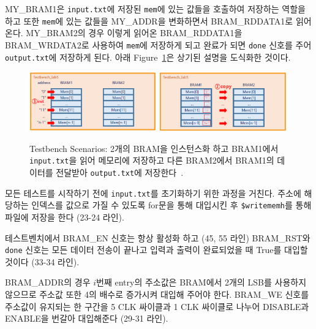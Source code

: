 \documentclass{article}
\begin{document}
MY\_BRAM1은 \texttt{input.txt}에 저장된 \texttt{mem}에 있는 값들을 호출하여 저장하는 역할을 하고 또한 \texttt{mem}에 있는 값들을 MY\_ADDR을 변화하면서 BRAM\_RDDATA1로 읽어온다. MY\_BRAM2의 경우 이렇게 읽어온 \linebreak BRAM\_RDDATA1을 BRAM\_WRDATA2로 사용하여 \texttt{mem}에 저장하게 되고 완료가 되면 \texttt{done} 신호를 주어 \linebreak \texttt{output.txt}에 저장하게 된다. 아래 Figure~\ref{fig1}은 상기된 설명을 도식화한 것이다.
\begin{figure}[ht]
	\centering
	\includegraphics[width=0.49\textwidth]{fig/fig1.png}
	\includegraphics[width=0.49\textwidth]{fig/fig2.png}
\caption{Testbench Scenarios: 2개의 BRAM을 인스턴스화 하고 BRAM1에서 \texttt{input.txt}을 읽어 메모리에 저장하고 다른 BRAM2에서 BRAM1의 데이터를 전달받아  \texttt{output.txt}에 저장한다~\cite{lab}. }
\label{fig1}
\end{figure}
\begin{itemize*}
\item 모든 테스트를 시작하기 전에 \texttt{input.txt}를 초기화하기 위한 과정을 거친다. 주소에 해당하는 인덱스를 값으로 가질 수 있도록 for문을 통해 대입시킨 후 \texttt{\$writememh}를 통해 파일에 저장을 한다 (23-24 라인).\\
\item 테스트벤치에서 BRAM\_EN 신호는 항상 활성화 하고 (45, 55 라인) BRAM\_RST와 \texttt{done} 신호는 모든 데이터 전송이 끝나고 입력과 출력이 완료되었을 때 True를 대입할 것이다 (33-34 라인).\\
\item BRAM\_ADDR의 경우 $i$번째 entry의 주소값은 BRAM에서 2개의 LSB를 사용하지 않으므로 주소값 또한 4의 배수로 증가시켜 대입해 주어야 한다. BRAM\_WE 신호를 주소값이 유지되는 한 구간을 5 CLK 싸이클과 1 CLK 싸이클로 나누어 DISABLE과 ENABLE을 번갈아 대입해준다 (29-31 라인).
\end{itemize*}
\end{document}
